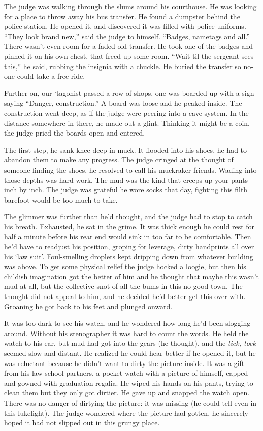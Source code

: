 \documentclass[oneside]{book}
\begin{document}
The judge was walking through the slums around his courthouse.
He was looking for a place to throw away his bus transfer.
He found a dumpster behind the police station.
He opened it, and discovered it was filled with police uniforms.
``They look brand new,'' said the judge to himself.
``Badges, nametags and all.''  There wasn't even room for a faded old transfer.
He took one of the badges and pinned it on his own chest, that freed up some
room.  ``Wait til the sergeant sees this,'' he said, rubbing the insignia with a chuckle.
He  buried the transfer so no-one could take a free ride.

Further on, our `tagonist passed a row of shops, one was boarded up with a sign
saying ``Danger, construction.''
A board was loose and he peaked inside.
The construction went deep, as if the judge were peering into a cave system.
In the distance somewhere in there, he made out a glint.  Thinking it might be a coin,
the judge pried the boards open and entered.

The first step, he sank knee deep in muck.  It flooded into his shoes,
he had to abandon them to make any progress.  The judge cringed at the thought
of someone finding the shoes, he resolved to call his muckraker friends.
Wading into those depths was hard work.  The mud was the kind that creeps up
your pants inch by inch.  The judge was grateful he wore socks that day,
fighting this filth barefoot would be too much to take.

The glimmer was further than he'd thought, and the judge had to stop to catch his breath.
Exhausted, he sat in the grime.  It was thick enough he could rest for half a minute before
his rear end would sink in too far to be comfortable.  Then he'd have to readjust his
position, groping for leverage, dirty handprints all over his `law suit'.
Foul-smelling droplets kept dripping down from whatever building was above.
To get some physical relief the judge hocked a loogie, but then his childish imagination
got the better of him and he thought that maybe this wasn't mud at all, but the collective
snot of all the bums in this no good town.  The thought did not appeal to him, and he
decided he'd better get this over with.  Groaning he got back to his feet and plunged
onward.

It was too dark to see his watch, and he wondered how long he'd been slogging around.
Without his stenographer it was hard to count the words.  He held the
watch to his ear, but mud had got into the gears (he thought), and the \emph{tick, tock}
seemed slow and distant.  He realized he could hear better if he opened it, but he
was reluctant because he didn't want to dirty the picture inside.  It was a gift from
his law school partners, a pocket watch with a picture of himself, capped and gowned with
graduation regalia.  He wiped his hands on his pants, trying to clean them but
they only got dirtier.
He gave up and snapped
the watch open.  There was no danger of dirtying the picture: it was missing (he could tell
even in this lukelight).  The judge wondered where the picture had gotten, he sincerely
hoped it had not slipped out in this grungy place.
\end{document}
